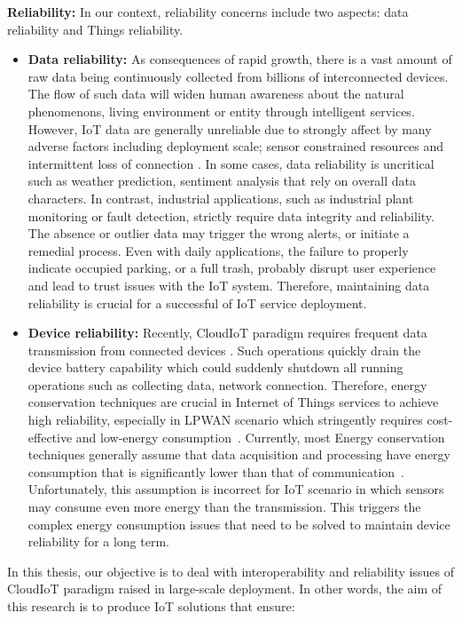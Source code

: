\par\textbf{Reliability: } In our context, reliability concerns include two aspects: data reliability and Things reliability.
\begin{itemize}
    \item \textbf{Data reliability: }As consequences of rapid growth, there is a vast amount of raw data being continuously collected from billions of interconnected devices. The flow of such data will widen human awareness about the natural phenomenons, living environment or entity through intelligent services.  However, IoT data are generally unreliable due to strongly affect by many adverse factors including deployment scale; sensor constrained resources \cite{branch2013network} and intermittent loss of connection \cite{zeng2011web}. In some cases, data reliability is uncritical such as weather prediction, sentiment analysis that rely on overall data characters. In contrast, industrial applications, such as industrial plant monitoring or fault detection, strictly require data integrity and reliability. The absence or outlier data may trigger the wrong alerts, or initiate a remedial process. Even with daily applications, the failure to properly indicate occupied parking, or a full trash, probably disrupt user experience and lead to trust issues with the IoT system. Therefore, maintaining data reliability is crucial for a successful of IoT service deployment. 
    \item \textbf{Device reliability: } Recently, CloudIoT paradigm requires frequent data transmission from connected devices \cite{lee2010extending}. Such operations quickly drain the device battery capability which could suddenly shutdown all running operations such as collecting data, network connection. Therefore, energy conservation techniques are crucial in Internet of Things services to achieve high reliability, especially in LPWAN scenario which stringently requires cost-effective and low-energy consumption~\cite{mikhaylov2016analysis}. Currently, most Energy conservation techniques generally assume that data acquisition and processing have energy consumption that is significantly lower than that of communication~\cite{alippi2010adaptive}. Unfortunately, this assumption is incorrect for IoT scenario in which sensors may consume even more energy than the transmission. This triggers the complex energy consumption issues that need to be solved to maintain device reliability for a long term.
\end{itemize}
\par  In this thesis, our objective is to deal with interoperability and reliability issues of CloudIoT paradigm raised in large-scale deployment. In other words, the aim of this research is to produce IoT solutions that ensure:
